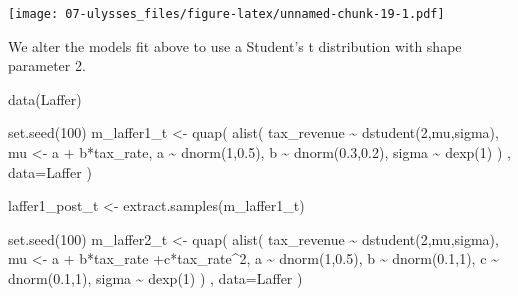 \documentclass[
]{book}
\newenvironment{Shaded}{\begin{snugshade}}{\end{snugshade}}
\newcommand{\AttributeTok}[1]{\textcolor[rgb]{0.77,0.63,0.00}{#1}}
\newcommand{\DecValTok}[1]{\textcolor[rgb]{0.00,0.00,0.81}{#1}}
\newcommand{\FloatTok}[1]{\textcolor[rgb]{0.00,0.00,0.81}{#1}}
\newcommand{\FunctionTok}[1]{\textcolor[rgb]{0.00,0.00,0.00}{#1}}
\newcommand{\NormalTok}[1]{#1}
\newcommand{\OtherTok}[1]{\textcolor[rgb]{0.56,0.35,0.01}{#1}}
\newcommand{\SpecialCharTok}[1]{\textcolor[rgb]{0.00,0.00,0.00}{#1}}
\begin{document}
\texttt{[image: 07-ulysses\_files/figure-latex/unnamed-chunk-19-1.pdf]}

We alter the models fit above to use a Student's t distribution with shape parameter 2.

\begin{Shaded}
\begin{Highlighting}[]
\FunctionTok{data}\NormalTok{(Laffer)}

\FunctionTok{set.seed}\NormalTok{(}\DecValTok{100}\NormalTok{)}
\NormalTok{ m\_laffer1\_t }\OtherTok{\textless{}{-}} \FunctionTok{quap}\NormalTok{( }\FunctionTok{alist}\NormalTok{(}
\NormalTok{ tax\_revenue }\SpecialCharTok{\textasciitilde{}} \FunctionTok{dstudent}\NormalTok{(}\DecValTok{2}\NormalTok{,mu,sigma), }
\NormalTok{ mu }\OtherTok{\textless{}{-}}\NormalTok{ a }\SpecialCharTok{+}\NormalTok{ b}\SpecialCharTok{*}\NormalTok{tax\_rate, }
\NormalTok{ a }\SpecialCharTok{\textasciitilde{}} \FunctionTok{dnorm}\NormalTok{(}\DecValTok{1}\NormalTok{,}\FloatTok{0.5}\NormalTok{), }
\NormalTok{ b }\SpecialCharTok{\textasciitilde{}} \FunctionTok{dnorm}\NormalTok{(}\FloatTok{0.3}\NormalTok{,}\FloatTok{0.2}\NormalTok{), }
\NormalTok{ sigma }\SpecialCharTok{\textasciitilde{}} \FunctionTok{dexp}\NormalTok{(}\DecValTok{1}\NormalTok{)}
\NormalTok{ ) , }\AttributeTok{data=}\NormalTok{Laffer )}
 
\NormalTok{ laffer1\_post\_t }\OtherTok{\textless{}{-}} \FunctionTok{extract.samples}\NormalTok{(m\_laffer1\_t)}

 \FunctionTok{set.seed}\NormalTok{(}\DecValTok{100}\NormalTok{)}
\NormalTok{ m\_laffer2\_t }\OtherTok{\textless{}{-}} \FunctionTok{quap}\NormalTok{( }\FunctionTok{alist}\NormalTok{(}
\NormalTok{ tax\_revenue }\SpecialCharTok{\textasciitilde{}} \FunctionTok{dstudent}\NormalTok{(}\DecValTok{2}\NormalTok{,mu,sigma), }
\NormalTok{ mu }\OtherTok{\textless{}{-}}\NormalTok{ a }\SpecialCharTok{+}\NormalTok{ b}\SpecialCharTok{*}\NormalTok{tax\_rate }\SpecialCharTok{+}\NormalTok{c}\SpecialCharTok{*}\NormalTok{tax\_rate}\SpecialCharTok{\^{}}\DecValTok{2}\NormalTok{, }
\NormalTok{ a }\SpecialCharTok{\textasciitilde{}} \FunctionTok{dnorm}\NormalTok{(}\DecValTok{1}\NormalTok{,}\FloatTok{0.5}\NormalTok{), }
\NormalTok{ b }\SpecialCharTok{\textasciitilde{}} \FunctionTok{dnorm}\NormalTok{(}\FloatTok{0.1}\NormalTok{,}\DecValTok{1}\NormalTok{), }
\NormalTok{ c }\SpecialCharTok{\textasciitilde{}} \FunctionTok{dnorm}\NormalTok{(}\FloatTok{0.1}\NormalTok{,}\DecValTok{1}\NormalTok{),}
\NormalTok{ sigma }\SpecialCharTok{\textasciitilde{}} \FunctionTok{dexp}\NormalTok{(}\DecValTok{1}\NormalTok{)}
\NormalTok{ ) , }\AttributeTok{data=}\NormalTok{Laffer )}
 

\end{Highlighting}
\end{Shaded}
\end{document}
